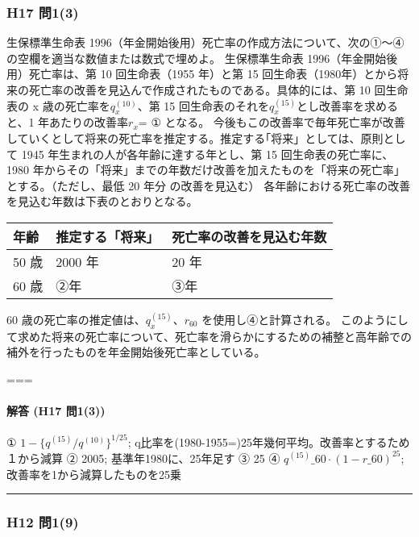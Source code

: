 \documentclass[]{article}
\begin{document}
\hypertarget{h17-ux554f13}{%
\subsubsection{H17 問1(3)}\label{h17-ux554f13}}

生保標準生命表
1996（年金開始後用）死亡率の作成方法について、次の①～④の空欄を適当な数値または数式で埋めよ。
生保標準生命表 1996（年金開始後用）死亡率は、第 10 回生命表（1955
年）と第 15
回生命表（1980年）とから将来の死亡率の改善を見込んで作成されたものである。具体的には、第
10 回生命表の x 歳の死亡率を\(q_x^{(10)}\)、第 15
回生命表のそれを\(q_x^{(15)}\)とし改善率を求めると、1
年あたりの改善率\(r_x\)= ① となる。
今後もこの改善率で毎年死亡率が改善していくとして将来の死亡率を推定する。推定する｢将来」としては、原則として
1945 年生まれの人が各年齢に達する年とし、第 15 回生命表の死亡率に、1980
年からその「将来」までの年数だけ改善を加えたものを「将来の死亡率」とする。（ただし、最低
20 年分 の改善を見込む）
各年齢における死亡率の改善を見込む年数は下表のとおりとなる。

\begin{longtable}[]{@{}lll@{}}
\toprule
年齢 & 推定する「将来」 & 死亡率の改善を見込む年数\tabularnewline
\midrule
\endhead
50 歳 & 2000 年 & 20 年\tabularnewline
60 歳 & ②年 & ③年\tabularnewline
\bottomrule
\end{longtable}

60 歳の死亡率の推定値は、\(q_x^{(15)}\)、\(r_{60}\)
を使用し④と計算される。
このようにして求めた将来の死亡率について、死亡率を滑らかにするための補整と高年齢での補外を行ったものを年金開始後死亡率としている。

===

\hypertarget{ux89e3ux7b54-h17-ux554f13}{%
\paragraph{解答 (H17 問1(3))}\label{ux89e3ux7b54-h17-ux554f13}}

① \(1-\{q^{(15)}/q^{(10)}\}^{1/25}\);
q比率を(1980-1955=)25年幾何平均。改善率とするため１から減算 ② 2005;
基準年1980に、25年足す ③ 25 ④ \(q^{(15)}\_{60}\cdot(1-r\_{60})^{25}\);
改善率を1から減算したものを25乗

\begin{center}\rule{0.5\linewidth}{0.5pt}\end{center}

\hypertarget{h12-ux554f19}{%
\subsubsection{H12 問1(9)}\label{h12-ux554f19}}
\end{document}
